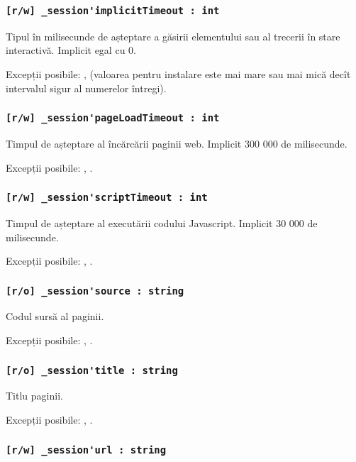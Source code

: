 \subsubsection{\lstinline|[r/w] _session'implicitTimeout : int|}

Tipul în milisecunde de așteptare a găsirii elementului sau al trecerii în stare interactivă. Implicit egal cu 0.

Excepții posibile: ,  (valoarea pentru instalare este mai mare sau mai mică decît intervalul sigur al numerelor întregi).

\subsubsection{\lstinline|[r/w] _session'pageLoadTimeout : int|}

Timpul de așteptare al încărcării paginii web. Implicit 300 000 de milisecunde.

Excepții posibile: , .

\subsubsection{\lstinline|[r/w] _session'scriptTimeout : int|}

Timpul de așteptare al executării codului Javascript. Implicit 30 000 de milisecunde.

Excepții posibile: , .

\subsubsection{\lstinline|[r/o] _session'source : string|}

Codul sursă al paginii.

Excepții posibile: , .

\subsubsection{\lstinline|[r/o] _session'title : string|}

Titlu paginii.

Excepții posibile: , .

\subsubsection{\lstinline|[r/w] _session'url : string|}

